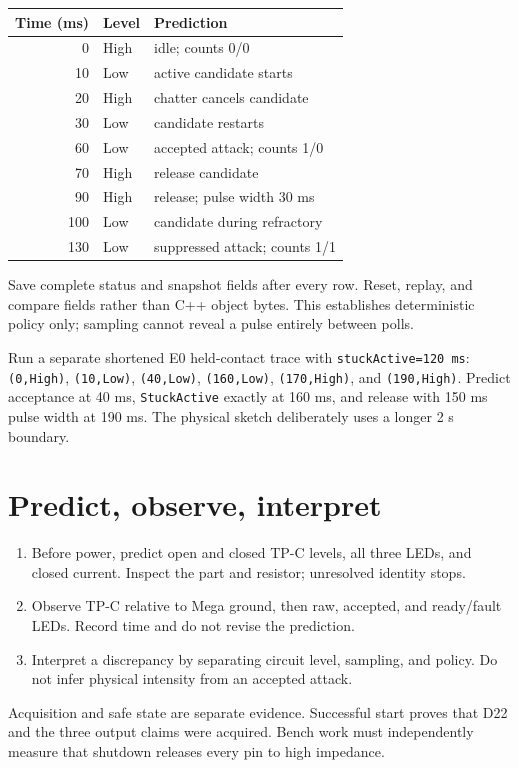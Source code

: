 \documentclass[11pt]{article}
\begin{document}
\begin{tabularx}{\linewidth}{@{}r l X@{}}
\toprule Time (ms) & Level & Prediction\\
\midrule
0 & High & idle; counts 0/0\\
10 & Low & active candidate starts\\
20 & High & chatter cancels candidate\\
30 & Low & candidate restarts\\
60 & Low & accepted attack; counts 1/0\\
70 & High & release candidate\\
90 & High & release; pulse width 30 ms\\
100 & Low & candidate during refractory\\
130 & Low & suppressed attack; counts 1/1\\
\bottomrule
\end{tabularx}
Save complete status and snapshot fields after every row. Reset, replay, and
compare fields rather than C++ object bytes. This establishes deterministic
policy only; sampling cannot reveal a pulse entirely between polls.

Run a separate shortened E0 held-contact trace with
\texttt{stuckActive=120 ms}: \texttt{(0,High)}, \texttt{(10,Low)},
\texttt{(40,Low)}, \texttt{(160,Low)}, \texttt{(170,High)}, and
\texttt{(190,High)}. Predict acceptance at 40 ms, \texttt{StuckActive}
exactly at 160 ms, and release with 150 ms pulse width at 190 ms. The physical
sketch deliberately uses a longer 2 s boundary.

\section{Predict, observe, interpret}
\begin{enumerate}
\item Before power, predict open and closed TP-C levels, all three LEDs, and
closed current. Inspect the part and resistor; unresolved identity stops.
\item Observe TP-C relative to Mega ground, then raw, accepted, and ready/fault
LEDs. Record time and do not revise the prediction.
\item Interpret a discrepancy by separating circuit level, sampling, and
policy. Do not infer physical intensity from an accepted attack.
\end{enumerate}
Acquisition and safe state are separate evidence. Successful start proves that
D22 and the three output claims were acquired. Bench work must independently
measure that shutdown releases every pin to high impedance.
\end{document}

